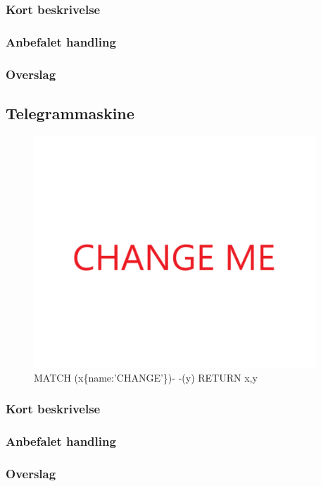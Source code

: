 \documentclass{article}
\begin{document}
\subsubsection{Kort beskrivelse}
\subsubsection{Anbefalet handling}
\subsubsection{Overslag}
\subsection{Telegrammaskine}
\begin{figure}[h]
\includegraphics[width=300pt]{CHANGE.PNG}
\caption{MATCH (x\{name:'CHANGE'\})- -(y) RETURN x,y}
\end{figure}
\subsubsection{Kort beskrivelse}
\subsubsection{Anbefalet handling}
\subsubsection{Overslag}
\end{document}
